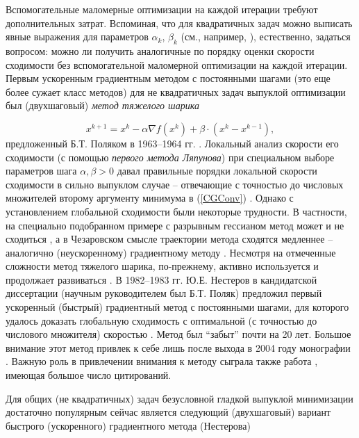     Вспомогательные маломерные оптимизации на каждой итерации требуют дополнительных затрат. Вспоминая, что для квадратичных задач можно выписать явные выражения для параметров $\alpha_k$, $\beta_k$ (см., например, \cite{Polyak1983}), естественно, задаться вопросом: можно ли получить аналогичные по порядку оценки скорости сходимости без вспомогательной маломерной оптимизации на каждой итерации. Первым ускоренным градиентным методом с постоянными шагами (это еще более сужает класс методов) для не квадратичных задач выпуклой оптимизации был (двухшаговый) \textit{метод тяжелого шарика}

    \begin{equation}
    \label{HB}
      x^{k+1}=x^k-\alpha \nabla f\left( {x^k} \right)+\beta \cdot \left({x^k-x^{k-1}} \right),
    \end{equation}
    предложенный Б.Т. Поляком в 1963--1964 гг. \cite{Polyak1964}. Локальный анализ скорости его сходимости (с помощью \textit{первого метода Ляпунова}) при специальном выборе параметров шага $\alpha ,\beta >0$ давал правильные порядки локальной скорости сходимости в сильно выпуклом случае --  отвечающие с точностью до числовых множителей второму аргументу минимума в (\ref{CGConv}) \cite{Polyak1983}. Однако с установлением глобальной сходимости были некоторые трудности. В частности, на специально подобранном примере с разрывным гессианом метод может и не сходиться \cite{lessard2016analysis}, а в Чезаровском смысле траектории метода сходятся медленнее -- аналогично (неускоренному) градиентному методу \cite{ghadimi2015global}. Несмотря на отмеченные сложности метод тяжелого шарика, по-прежнему, активно используется и продолжает развиваться \cite{loizou2017linearly}. В 1982--1983 гг. Ю.Е. Нестеров в кандидатской диссертации (научным руководителем был Б.Т. Поляк) предложил первый ускоренный (быстрый) градиентный метод с постоянными шагами, для которого удалось доказать глобальную сходимость с оптимальной (с точностью до числового множителя) скоростью \cite{Nesterov1983}. Метод был ``забыт'' почти на 20 лет. Большое внимание этот метод привлек к себе лишь после выхода в 2004 году монографии \cite{nesterov2013introductory}. Важную роль в привлечении внимания к методу сыграла также работа \cite{beck2009fast}, имеющая большое число цитирований.
  \fi

  Для общих (не квадратичных) задач безусловной гладкой выпуклой минимизации достаточно популярным сейчас является следующий (двухшаговый) вариант быстрого (ускоренного) градиентного метода (Нестерова) 

